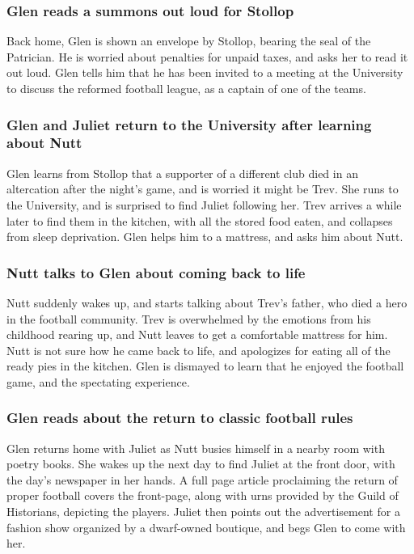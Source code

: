 \subsubsection{\Gls{Glen} reads a summons out loud for \Gls{Stollop}}
Back home, \Gls{Glen} is shown an envelope by \Gls{Stollop}, bearing the seal of the Patrician. He
is worried about penalties for unpaid taxes, and asks her to read it out loud. \Gls{Glen} tells him
that he has been invited to a meeting at the University to discuss the reformed football league,
as a captain of one of the teams.

\subsubsection{\Gls{Glen} and \Gls{Juliet} return to the University after learning about \Gls{Nutt}}
\Gls{Glen} learns from \Gls{Stollop} that a supporter of a different club died in an altercation
after the night's game, and is worried it might be \Gls{Trev}. She runs to the University, and is
surprised to find \Gls{Juliet} following her. \Gls{Trev} arrives a while later to find them in the
kitchen, with all the stored food eaten, and collapses from sleep deprivation. \Gls{Glen} helps him
to a mattress, and asks him about \Gls{Nutt}.

\subsubsection{\Gls{Nutt} talks to \Gls{Glen} about coming back to life}
\Gls{Nutt} suddenly wakes up, and starts talking about \Gls{Trev}'s father, who died a hero in the
football community. \Gls{Trev} is overwhelmed by the emotions from his childhood rearing up, and
\Gls{Nutt} leaves to get a comfortable mattress for him. \Gls{Nutt} is not sure how he came back
to life, and apologizes for eating all of the ready pies in the kitchen. \Gls{Glen} is dismayed to
learn that he enjoyed the football game, and the spectating experience.

\subsubsection{\Gls{Glen} reads about the return to classic football rules}
\Gls{Glen} returns home with \Gls{Juliet} as \Gls{Nutt} busies himself in a nearby room with poetry
books. She wakes up the next day to find \Gls{Juliet} at the front door, with the day's newspaper
in her hands. A full page article proclaiming the return of proper football covers the front-page,
along with urns provided by the Guild of Historians, depicting the players. \Gls{Juliet} then points
out the advertisement for a fashion show organized by a dwarf-owned boutique, and begs \Gls{Glen} to
come with her.

